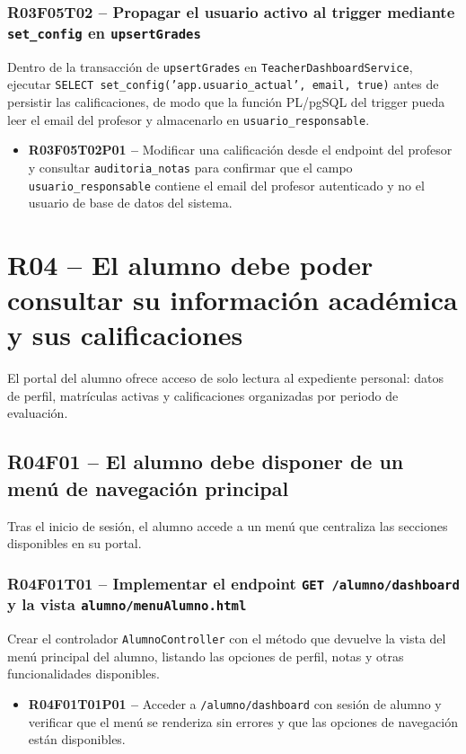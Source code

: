 \documentclass[12pt, a4paper]{report}
\begin{document}
\subsubsection{R03F05T02 -- Propagar el usuario activo al trigger mediante \texttt{set\_config} en \texttt{upsertGrades}}
Dentro de la transacción de \texttt{upsertGrades} en \texttt{TeacherDashboardService}, ejecutar \texttt{SELECT set\_config('app.usuario\_actual', email, true)} antes de persistir las calificaciones, de modo que la función PL/pgSQL del trigger pueda leer el email del profesor y almacenarlo en \texttt{usuario\_responsable}.
\begin{itemize}
  \item \textbf{R03F05T02P01 --} Modificar una calificación desde el endpoint del profesor y consultar \texttt{auditoria\_notas} para confirmar que el campo \texttt{usuario\_responsable} contiene el email del profesor autenticado y no el usuario de base de datos del sistema.
\end{itemize}

\section{R04 -- El alumno debe poder consultar su información académica y sus calificaciones}

El portal del alumno ofrece acceso de solo lectura al expediente personal: datos de perfil, matrículas activas y calificaciones organizadas por periodo de evaluación.

\subsection{R04F01 -- El alumno debe disponer de un menú de navegación principal}

Tras el inicio de sesión, el alumno accede a un menú que centraliza las secciones disponibles en su portal.

\subsubsection{R04F01T01 -- Implementar el endpoint \texttt{GET /alumno/dashboard} y la vista \texttt{alumno/menuAlumno.html}}
Crear el controlador \texttt{AlumnoController} con el método que devuelve la vista del menú principal del alumno, listando las opciones de perfil, notas y otras funcionalidades disponibles.
\begin{itemize}
  \item \textbf{R04F01T01P01 --} Acceder a \texttt{/alumno/dashboard} con sesión de alumno y verificar que el menú se renderiza sin errores y que las opciones de navegación están disponibles.
\end{itemize}
\end{document}
